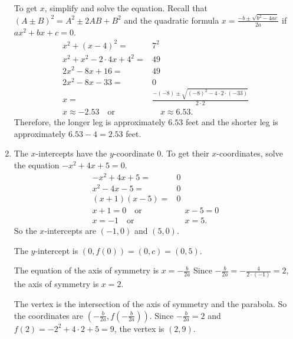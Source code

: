 \documentclass[
  12pt]{article}
\begin{document}
\begin{enumerate}
  To get \(x\), simplify and solve the equation. Recall that
  \((A\pm B)^2=A^2\pm 2AB+B^2\) and the quadratic formula
  \(x=\frac{-b\pm\sqrt{b^2-4ac}}{2a}\) if \(ax^2+bx+c=0\). \[
  \begin{aligned}
  x^2+(x-4)^2=&7^2\\
  x^2+x^2-2\cdot 4x+4^2=&49\\
  2x^2-8x+16=&49\\
  2x^2-8x-33=&0\\
  x=&\frac{-(-8)\pm\sqrt{(-8)^2-4\cdot2\cdot(-33)}}{2\cdot 2}\\
  x\approx -2.53\quad\text{or}&\quad x\approx 6.53.
  \end{aligned}
  \] Therefore, the longer leg is approximately \(6.53\) feet and the
  shorter leg is approximately \(6.53-4=2.53\) feet.
\item
  The \(x\)-intercepts have the \(y\)-coordinate \(0\). To get their
  \(x\)-coordinates, solve the equation \(-x^2+4x+5=0\). \[
  \begin{aligned}
  -x^2+4x+5=&0\\
  x^2-4x-5=&0\\
  (x+1)(x-5)=&0\\
  x+1=0\quad\text{or}&\quad x-5=0\\
  x=-1\quad\text{or}&\quad x=5.
  \end{aligned}
  \] So the \(x\)-intercepts are \((-1, 0)\) and \((5, 0)\).

  The \(y\)-intercept is \((0, f(0))=(0, c)=(0, 5)\).

  The equation of the axis of symmetry is \(x=-\frac{b}{2a}\) Since
  \(-\frac{b}{2a}=-\frac{4}{2\cdot(-1)}=2\), the axis of symmetry is
  \(x=2\).

  The vertex is the intersection of the axis of symmetry and the
  parabola. So the coordinates are
  \(\left(-\frac{b}{2a}, f\left(-\frac{b}{2a}\right)\right)\). Since
  \(-\frac{b}{2a}=2\) and \(f(2)=-2^2+4\cdot 2+5=9\), the vertex is
  \((2, 9)\).


\end{enumerate}
\end{document}

